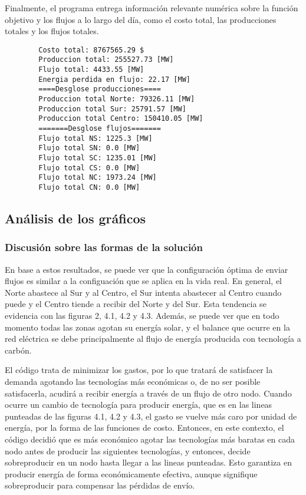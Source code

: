 \documentclass[12pt,twoside]{article}
\begin{document}
	\hspace{1cm} Finalmente, el programa entrega informaci\'on relevante num\'erica sobre la funci\'on objetivo y los flujos a lo largo del d\'ia, como el costo total, las producciones totales y los flujos totales.
	
	\begin{lstlisting}
		Costo total: 8767565.29 $
		Produccion total: 255527.73 [MW]
		Flujo total: 4433.55 [MW]
		Energia perdida en flujo: 22.17 [MW]
		====Desglose producciones====
		Produccion total Norte: 79326.11 [MW]
		Produccion total Sur: 25791.57 [MW]
		Produccion total Centro: 150410.05 [MW]
		=======Desglose flujos=======
		Flujo total NS: 1225.3 [MW]
		Flujo total SN: 0.0 [MW]
		Flujo total SC: 1235.01 [MW]
		Flujo total CS: 0.0 [MW]
		Flujo total NC: 1973.24 [MW]
		Flujo total CN: 0.0 [MW]\end{lstlisting}
	
	\subsection{An\'alisis de los gr\'aficos}
	\subsubsection{Discusi\'on sobre las formas de la soluci\'on}
	\hspace{1cm} En base a estos resultados, se puede ver que la configuraci\'on \'optima de enviar flujos es similar a la configuaci\'on que se aplica en la vida real. En general, el Norte abastece al Sur y al Centro, el Sur intenta abastecer al Centro cuando puede y el Centro tiende a recibir del Norte y del Sur. Esta tendencia se evidencia con las figuras 2, 4.1, 4.2 y 4.3. Adem\'as, se puede ver que en todo momento todas las zonas agotan su energ\'ia solar, y el balance que ocurre en la red el\'ectrica se debe principalmente al flujo de energ\'ia producida con tecnolog\'ia a carb\'on.
	
	\hspace{1cm} El c\'odigo trata de minimizar los gastos, por lo que tratará de satisfacer la demanda agotando las tecnologías más económicas o, de no ser posible satisfacerla, acudirá a recibir energía a través de un flujo de otro nodo. Cuando ocurre un cambio de tecnolog\'ia para producir energ\'ia, que es en las lineas punteadas de las figuras 4.1, 4.2 y 4.3, el gasto se vuelve m\'as caro por unidad de energ\'ia, por la forma de las funciones de costo. Entonces, en este contexto, el c\'odigo decidi\'o que es m\'as econ\'omico agotar las tecnolog\'ias m\'as baratas en cada nodo antes de producir las siguientes tecnolog\'ias, y entonces, decide sobreproducir en un nodo hasta llegar a las lineas punteadas. Esto garantiza en producir energ\'ia de forma econ\'omicamente efectiva, aunque signifique sobreproducir para compensar las p\'erdidas de env\'io.
	
\end{document}
